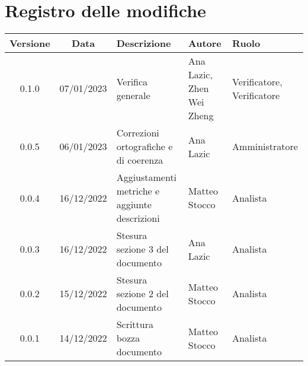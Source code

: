 \section*{Registro delle modifiche}
\begin{table}[H]
	\centering
	\renewcommand\tabularxcolumn[1]{>{\Centering}m{#1}}
	\begin{tabularx}{\textwidth}{| c | c | X | X | X |} 
	\hline
	\textbf{Versione} & \textbf{Data} & \textbf{Descrizione} & \textbf{Autore} & \textbf{Ruolo}\\
    \hline
	0.1.0 & 07/01/2023 & Verifica generale & Ana Lazic, Zhen Wei Zheng & Verificatore, Verificatore \\
    \hline
	0.0.5 & 06/01/2023 & Correzioni ortografiche e di coerenza & Ana Lazic & Amministratore \\
	\hline
	0.0.4 & 16/12/2022 & Aggiustamenti metriche e aggiunte descrizioni & Matteo Stocco & Analista \\
     \hline
	0.0.3 & 16/12/2022 & Stesura sezione 3 del documento & Ana Lazic & Analista \\
	\hline
	0.0.2 & 15/12/2022 & Stesura sezione 2 del documento & Matteo Stocco & Analista \\
	\hline
	0.0.1 & 14/12/2022 & Scrittura bozza documento & Matteo Stocco & Analista \\
	\hline
	\end{tabularx}
\end{table}
